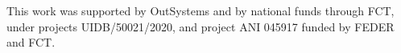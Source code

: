 \section*{\acknowledgments}


This work was supported by OutSystems and by national funds through FCT, under projects UIDB/50021/2020, and project ANI 045917 funded by FEDER and FCT.

\cleardoublepage